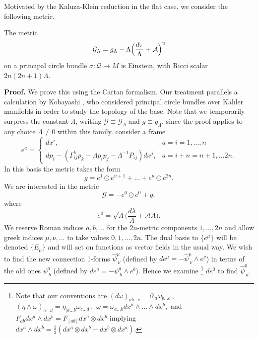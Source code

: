 Motivated by the Kaluza-Klein reduction in the flat case, we consider
the following metric.
\begin{theo}
The metric
\begin{equation}
\mathcal{G}_{\Lambda}=g_{\Lambda}-\Lambda\Bigl(\frac{ d\tau}{\Lambda}+\mathcal{A}\Bigr)^{2}\label{eq:G}
\end{equation}
on a principal circle bundle $\sigma:\mathcal{Q}\mapsto M$ is Einstein,
with Ricci scalar $2n(2n+1)\Lambda$.
\end{theo}
\textbf{Proof.} We prove this using the Cartan formalism. Our treatment
parallels a calculation by Kobayashi \cite{Kobayashi1963}, who considered
principal circle bundles over Kahler manifolds in order to study the
topology of the base. Note that we temporarily surpress the constant
$\Lambda$, writing $\mathcal{G}\equiv\mathcal{G}_{\Lambda}$ and
$g\equiv g_{\Lambda}$, since the proof applies to any choice $\Lambda\neq0$
within this family. consider a frame
\begin{equation}
e^{a}=\begin{cases}
 dx^{i}, & a=i=1,\dots,n\\
 dp_{i}-(\Gamma_{ij}^{k}p_{k}-\Lambda p_{i}p_{j}-\Lambda^{-1}P_{ij}) dx^{j}, & a=i+n=n+1,\dots2n.
\end{cases}\label{eq:basis}
\end{equation}
In this basis the metric takes the form
\begin{equation}
g=e^{1}\odot e^{n+1}+\dots+e^{n}\odot e^{2n}.\label{eq:g_cov_const}
\end{equation}
We are interested in the metric
\[
\mathcal{G}=-e^{0}\odot e^{0}+g,
\]
where
\[
e^{0}=\sqrt{\Lambda}\biggl(\frac{ d\lambda}{\Lambda}+\mathcal{A}A\biggr).
\]
 We reserve Roman indices $a,b,\dots$ for the $2n$-metric components
$1,\dots,2n$ and allow greek indices $\mu,\nu,\dots$ to take values
$0,1,\dots,2n$. The dual basis to $\{e^{\mu}\}$ will be denoted
$\{E_{\mu}\}$ and will act on functions as vector fields in the usual
way. We wish to find the new connection 1-forms $\hat{\psi}_{\ \nu}^{\mu}$
(defined by $ de^{\mu}=-\hat{\psi}_{\ \nu}^{\mu}\wedge e^{\nu}$)
in terms of the old ones $\psi_{\ b}^{a}$ (defined by $ de^{a}=-\psi_{\ b}^{a}\wedge e^{b}$).
Hence we examine
\footnote{Note that our conventions are $(d\omega)_{ab\dots c}=\partial_{[a}\omega_{b\dots c]},$
$(\eta\wedge\omega)_{a\dots d}=\eta_{[a\dots b}\omega_{c\dots d]},$
$\omega=\omega_{a\dots b}dx^{a}\wedge\dots\wedge dx^{b},$
and $F_{ab}{d}x^{a}\wedge{d}x^{b}=F_{[ab]}{d}x^{a}\otimes{d}x^{b}$
implying ${d}x^{a}\wedge{d}x^{b}=\frac{1}{2}({d}x^{a}\otimes{d}x^{b}-{d}x^{b}\otimes{d}x^{a})$.
} ${d}e^{0}$ to find $\hat{\psi}_{\ a}^{0}.$
